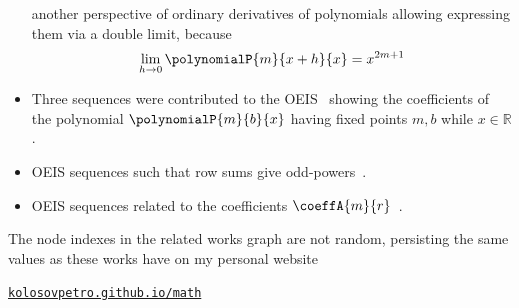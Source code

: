 \begin{itemize}
    another perspective of ordinary derivatives of polynomials allowing expressing
    them via a double limit, because
    \begin{align*}
        \lim_{h \to 0} \polynomialP{m}{x+h}{x} = x^{2m+1}
    \end{align*}
    \item Three sequences were contributed to the
    OEIS~\cite{oeis_coefficients_u_m_l_k_defined_by_polynomial_identity_1, oeis_coefficients_u_m_l_k_defined_by_polynomial_identity_2, oeis_coefficients_u_m_l_k_defined_by_polynomial_identity_3}
    showing the coefficients of the polynomial $\polynomialP{m}{b}{x}$ having fixed points $m,b$ while $x\in\mathbb{R}$.
    \item OEIS sequences such that row sums give odd-powers~\cite{oeis_numerical_triangle_row_sums_give_cubes, oeis_numerical_triangle_row_sums_give_fifth_powers, oeis_numerical_triangle_row_sums_give_seventh_powers}.
    \item OEIS sequences related to the coefficients $\coeffA{m}{r}$~\cite{oeis_numerators_of_the_coefficient_a_m_r, oeis_denominators_of_the_coefficient_a_m_r}.
\end{itemize}
The node indexes in the related works graph are not random, persisting the same values as
these works have on my personal website
\begin{center}
    \href{https://kolosovpetro.github.io/math/}{\texttt{kolosovpetro.github.io/math}}
\end{center}
